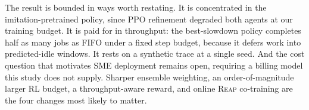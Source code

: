 \documentclass{svproc}
\newcommand{\reap}{\textsc{Reap}}
\begin{document}
The result is bounded in ways worth restating. It is concentrated in
the imitation-pretrained policy, since PPO refinement degraded both
agents at our training budget. It is paid for in throughput: the
best-slowdown policy completes half as many jobs as FIFO under a fixed
step budget, because it defers work into predicted-idle windows. It
rests on a synthetic trace at a single seed. And the cost question that
motivates SME deployment remains open, requiring a billing model this
study does not supply. Sharper ensemble weighting, an order-of-magnitude
larger RL budget, a throughput-aware reward, and online \reap{}
co-training are the four changes most likely to matter.



\end{document}
